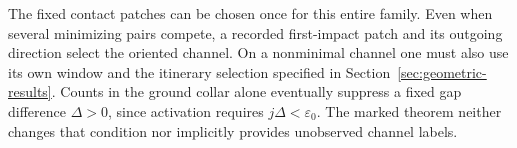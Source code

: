 The fixed contact patches can be chosen once for this entire family.
Even when several minimizing pairs compete, a recorded first-impact
patch and its outgoing direction select the oriented channel. On a
nonminimal channel one must also use its own window and the itinerary
selection specified in Section~\ref{sec:geometric-results}. Counts in
the ground collar alone eventually suppress a fixed gap difference
$\Delta>0$, since activation requires $j\Delta<\varepsilon_0$.
The marked theorem neither changes that condition nor implicitly
provides unobserved channel labels.
